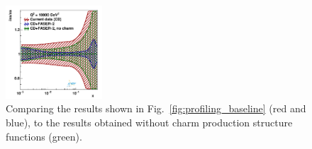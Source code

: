 \begin{figure}[t]
\includegraphics[width=0.32\textwidth]{plots/proton_fasernu2/inclusive-only_vs_inclusive+charm/statOnly_FASERv2_q2_10000_pdf_s_ratio.pdf}
\caption{Comparing the results shown in Fig.~\ref{fig:profiling_baseline} (red and blue), 
to the results obtained without charm production structure functions (green).
}
\label{fig:profiling_charm}
\end{figure}

